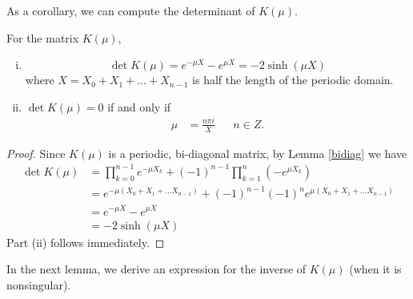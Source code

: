 \documentclass[thesis.tex]{subfiles}
\begin{document}
As a corollary, we can compute the determinant of $K(\mu)$.
\begin{corollary}\label{detKcorr}
For the matrix $K(\mu)$, 
\begin{enumerate}[(i)]
\item 
\begin{equation}\label{detK}
\det K(\mu) = e^{-\mu X} - e^{\mu X} = -2 \sinh (\mu X)
\end{equation}
where $X = X_0 + X_1 + \dots + X_{n-1}$ is half the length of the periodic domain. 
\item $\det K(\mu) = 0$ if and only if 
\begin{align*}
\mu &= \frac{n \pi i}{X} && n \in Z.
\end{align*} 
\end{enumerate}
\begin{proof}
Since $K(\mu)$ is a periodic, bi-diagonal matrix, by Lemma \ref{bidiag} we have
\begin{align*}
\det K(\mu) &= \prod_{k = 0}^{n-1} e^{-\mu X_k} + (-1)^{n-1} \prod_{k = 1}^n (-e^{\mu X_k}) \\
&= e^{-\mu(X_0 + X_1 + \dots X_{n-1})} + (-1)^{n-1} (-1)^n e^{\mu(X_0 + X_1 + \dots X_{n-1})} \\
&= e^{-\mu X} - e^{\mu X} \\
&= -2 \sinh (\mu X)
\end{align*}
Part (ii) follows immediately.
\end{proof}
\end{corollary}

In the next lemma, we derive an expression for the inverse of $K(\mu)$ (when it is nonsingular).
\end{document}
